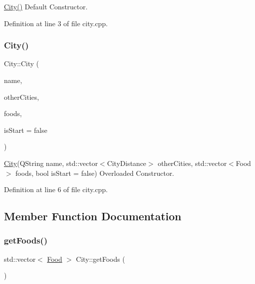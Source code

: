 \mbox{\hyperlink{class_city_a1b1f549430f0a7ecd0ec7b1605415193}{City()}} Default Constructor. 



Definition at line 3 of file city.\+cpp.

\mbox{\label{class_city_a45f0a3c80b0e4ff9dc33256d2ff5eb0d}} 
\subsubsection{\texorpdfstring{City()}{City()}\hspace{0.1cm}{\footnotesize\ttfamily [2/2]}}
{\footnotesize\ttfamily City\+::\+City (\begin{DoxyParamCaption}\item[{Q\+String}]{name,  }\item[{std\+::vector$<$ \mbox{\hyperlink{struct_city_distance}{City\+Distance}} $>$}]{other\+Cities,  }\item[{std\+::vector$<$ \mbox{\hyperlink{class_food}{Food}} $>$}]{foods,  }\item[{bool}]{is\+Start = {\ttfamily false} }\end{DoxyParamCaption})}



\mbox{\hyperlink{class_city}{City}}(Q\+String name, std\+::vector$<$\+City\+Distance$>$ other\+Cities, std\+::vector$<$\+Food$>$ foods, bool is\+Start = false) Overloaded Constructor. 



Definition at line 6 of file city.\+cpp.



\subsection{Member Function Documentation}
\mbox{\label{class_city_abbfdb9d3dba484ee8f9daee6ef03cd97}} 
\subsubsection{\texorpdfstring{getFoods()}{getFoods()}}
{\footnotesize\ttfamily std\+::vector$<$ \mbox{\hyperlink{class_food}{Food}} $>$ City\+::get\+Foods (\begin{DoxyParamCaption}{ }\end{DoxyParamCaption})}




